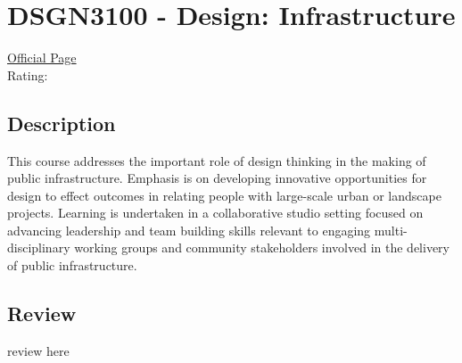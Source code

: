 \hypertarget{DSGN3100}{\section{DSGN3100 - Design: Infrastructure}}

\large
\textcolor{turbo_purple}{\href{https://my.uq.edu.au/programs-courses/course.html?course_code=DSGN3100}{Official Page}} \\
Rating: \cstar\cstar\cstar\cstar\ostar

\normalsize
\subsection*{Description}
This course addresses the important role of design thinking in the making of public infrastructure.
Emphasis is on developing innovative opportunities for design to effect outcomes in relating people with large-scale urban or landscape projects.
Learning is undertaken in a collaborative studio setting focused on advancing leadership and team building skills relevant to engaging multi-disciplinary working groups and community stakeholders involved in the delivery of public infrastructure.

\subsection*{Review}
review here
